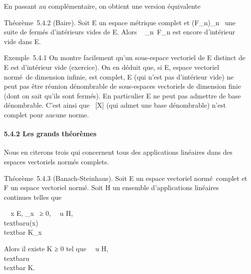 \documentclass[]{article}
\begin{document}
En passant au complémentaire, on obtient une version équivalente

Théorème~5.4.2 (Baire). Soit E un espace métrique complet et
(F\_n)\_n\in{}~ une suite de fermés d'intérieurs vides de E.
Alors \⋃ ~
\_n\in{}~F\_n est encore d'intérieur vide dans E.

Exemple~5.4.1 On montre facilement qu'un sous-espace vectoriel de E
distinct de E est d'intérieur vide (exercice). On en déduit que, si E,
espace vectoriel normé~de dimension infinie, est complet, E (qui n'est
pas d'intérieur vide) ne peut pas être réunion dénombrable de
sous-espaces vectoriels de dimension finie (dont on sait qu'ils sont
fermés). En particulier E ne peut pas admettre de base dénombrable.
C'est ainsi que ~{[}X{]} (qui admet une base dénombrable) n'est complet
pour aucune norme.

\paragraph{5.4.2 Les grands théorèmes}

Nous en citerons trois qui concernent tous des applications linéaires
dans des espaces vectoriels normés complets.

Théorème~5.4.3 (Banach-Steinhaus). Soit E un espace vectoriel
normé~complet et F un espace vectoriel normé. Soit H un ensemble
d'applications linéaires continues telles que

\forall~~x \in E,
\existsK\_x~ ≥ 0,
\forall~~u \in H,\quad
\\textbar{}u(x)\\textbar{} \leq K\_x

Alors il existe K ≥ 0 tel que \forall~~u \in H,
\\textbar{}u\\textbar{} \leq K.
\end{document}

